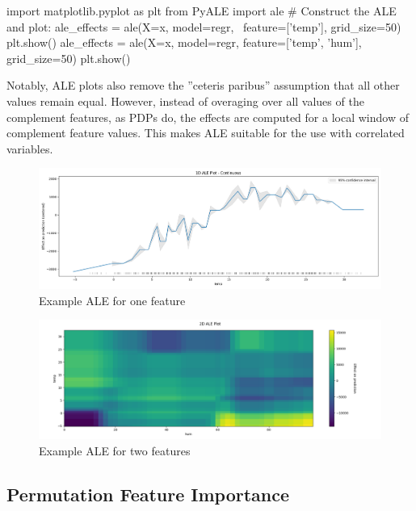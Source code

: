 \begin{samepage}
\begin{pythoncode}
import matplotlib.pyplot as plt
from PyALE import ale
# Construct the ALE and plot:
ale_effects = ale(X=x, model=regr, \
    feature=['temp'], grid_size=50)
plt.show()
ale_effects = ale(X=x, model=regr, 
    feature=['temp', 'hum'], grid_size=50)
plt.show()
\end{pythoncode}
\end{samepage}

Notably, ALE plots also remove the ''ceteris paribus'' assumption that all other values remain equal. However, instead of overaging over all values of the complement features, as PDPs do, the effects are computed for a local window of complement feature values. This makes ALE suitable for the use with correlated variables. 

\begin{figure}
\centering

\includegraphics[width=\linewidth]{ale_dtr.png} 
\caption{Example ALE for one feature}
\label{fig:ale1}
\end{figure}

\begin{figure}
\centering

\includegraphics[width=\linewidth]{2d_ale_dtr.png}
\caption{Example ALE for two features}
\label{fig:ale2}
\end{figure}

\FloatBarrier
\subsection{Permutation Feature Importance}

